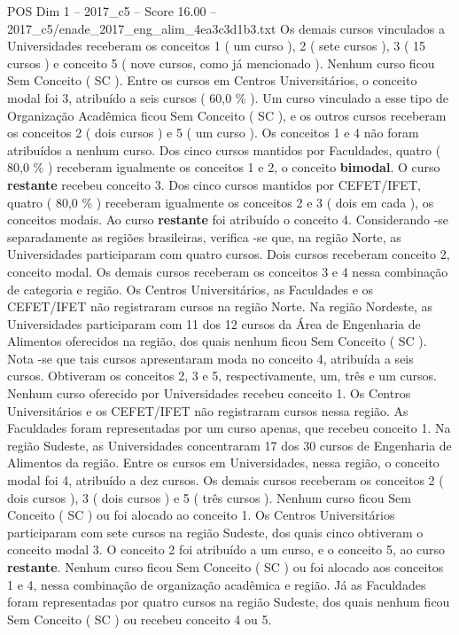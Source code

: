 \begin{textsample}{POS Dim 1 – 2017\_c5 – Score 16.00 – 2017\_c5/enade\_2017\_eng\_alim\_4ea3c3d1b3.txt}
Os demais cursos vinculados a Universidades receberam os conceitos 1 ( um curso ), 2 ( sete cursos ), 3 ( 15 cursos ) e conceito 5 ( nove cursos, como já mencionado ).
Nenhum curso ficou Sem Conceito ( SC ).
Entre os cursos em Centros Universitários, o conceito modal foi 3, atribuído a seis cursos ( 60,0 \% ).
Um curso vinculado a esse tipo de Organização Acadêmica ficou Sem Conceito ( SC ), e os outros cursos receberam os conceitos 2 ( dois cursos ) e 5 ( um curso ).
Os conceitos 1 e 4 não foram atribuídos a nenhum curso.
Dos cinco cursos mantidos por Faculdades, quatro ( 80,0 \% ) receberam igualmente os conceitos 1 e 2, o conceito \textbf{bimodal}.
O curso \textbf{restante} recebeu conceito 3.
Dos cinco cursos mantidos por CEFET/IFET, quatro ( 80,0 \% ) receberam igualmente os conceitos 2 e 3 ( dois em cada ), os conceitos modais.
Ao curso \textbf{restante} foi atribuído o conceito 4.
Considerando -se separadamente as regiões brasileiras, verifica -se que, na região Norte, as Universidades participaram com quatro cursos.
Dois cursos receberam conceito 2, conceito modal.
Os demais cursos receberam os conceitos 3 e 4 nessa combinação de categoria e região.
Os Centros Universitários, as Faculdades e os CEFET/IFET não registraram cursos na região Norte.
Na região Nordeste, as Universidades participaram com 11 dos 12 cursos da Área de Engenharia de Alimentos oferecidos na região, dos quais nenhum ficou Sem Conceito ( SC ).
Nota -se que tais cursos apresentaram moda no conceito 4, atribuída a seis cursos.
Obtiveram os conceitos 2, 3 e 5, respectivamente, um, três e um cursos.
Nenhum curso oferecido por Universidades recebeu conceito 1.
Os Centros Universitários e os CEFET/IFET não registraram cursos nessa região.
As Faculdades foram representadas por um curso apenas, que recebeu conceito 1.
Na região Sudeste, as Universidades concentraram 17 dos 30 cursos de Engenharia de Alimentos da região.
Entre os cursos em Universidades, nessa região, o conceito modal foi 4, atribuído a dez cursos.
Os demais cursos receberam os conceitos 2 ( dois cursos ), 3 ( dois cursos ) e 5 ( três cursos ).
Nenhum curso ficou Sem Conceito ( SC ) ou foi alocado ao conceito 1.
Os Centros Universitários participaram com sete cursos na região Sudeste, dos quais cinco obtiveram o conceito modal 3.
O conceito 2 foi atribuído a um curso, e o conceito 5, ao curso \textbf{restante}.
Nenhum curso ficou Sem Conceito ( SC ) ou foi alocado aos conceitos 1 e 4, nessa combinação de organização acadêmica e região.
Já as Faculdades foram representadas por quatro cursos na região Sudeste, dos quais nenhum ficou Sem Conceito ( SC ) ou recebeu conceito 4 ou 5.

\end{textsample}
